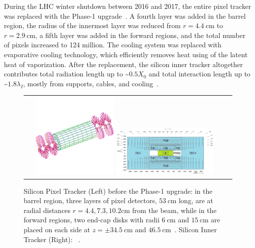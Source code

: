 During the LHC winter shutdown between 2016 and 2017, the entire pixel tracker was replaced with the Phase-1 upgrade~\cite{Lipinski_2017}.
A fourth layer was added in the barrel region, the radius of the innermost layer was reduced from $r = \SI{4.4}{\cm}$ to $r = \SI{2.9}{\cm}$, a fifth layer was added in the forward regions, and the total number of pixels increased to 124 million.
The cooling system was replaced with evaporative  cooling technology, which efficiently removes heat using of the latent heat of vaporization.
After the replacement, the silicon inner tracker altogether contributes total radiation length up to \sim$0.5 X_0$ and total interaction length up to \sim$1.8 \lambda_I$, mostly from supports, cables, and cooling~\cite{Sirunyan:2270046}.
\begin{figure}[!htb]
  \begin{center}
    \begin{tabular}{cc}
        \includegraphics[width=0.40\textwidth]{fig_LHC_CMS/Pixel_Detector.pdf}
        \includegraphics[width=0.50\textwidth]{fig_LHC_CMS/Inner_Tracker.png}
    \end{tabular}
    \caption{Silicon Pixel Tracker (Left) before the Phase-1 upgrade: in the barrel region, three layers of pixel detectors, $\SI{53}{\cm}$ long, are at radial distances $r = 4.4, 7.3, 10.2 \si{\cm}$ from the beam, while in the forward regions, two end-cap disks with radii $\SI{6}{\cm}$ and $\SI{15}{\cm}$ are placed on each side at $z = \pm \SI{34.5}{\cm}$ and $\SI{46.5}{\cm}$~\cite{Bayatian:922757}.
            Silicon Inner Tracker (Right): ~\cite{Chatrchyan:1129810}.
            }
    \label{Inner_Tracker}
  \end{center}
\end{figure}

